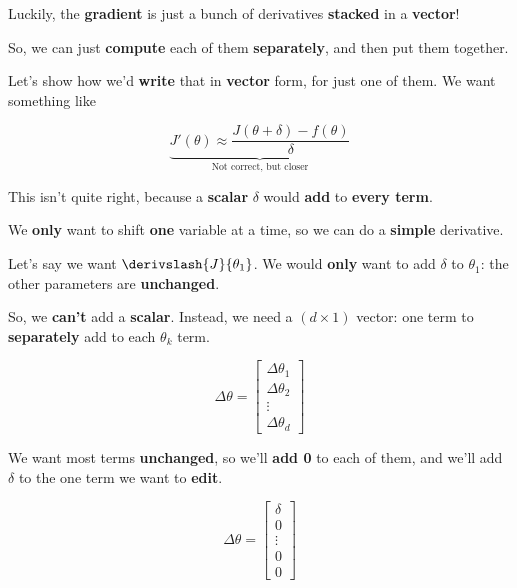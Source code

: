         Luckily, the \textbf{gradient} is just a bunch of derivatives \textbf{stacked} in a \textbf{vector}! 
        
        So, we can just \textbf{compute} each of them \textbf{separately}, and then put them together.
        
        Let's show how we'd \textbf{write} that in \textbf{vector} form, for just one of them. We want something like
        
        \begin{equation}
            \underbrace{
                J'(\theta) \approx
                \frac{J(\theta+\delta)-f(\theta)}{\delta} 
            }_{\text{Not correct, but closer}}
        \end{equation}
        
        This isn't quite right, because a \textbf{scalar} $\delta$ would \textbf{add} to \textbf{every term}.
        
        We \textbf{only} want to shift \textbf{one} variable at a time, so we can do a \textbf{simple} derivative.
        
        Let's say we want $\derivslash{J}{\theta_1}$. We would \textbf{only} want to add $\delta$ to $\theta_1$: the other parameters are \textbf{unchanged}.
        
        So, we \textbf{can't} add a \textbf{scalar}. Instead, we need a $(d \times 1)$ vector: one term to \textbf{separately} add to each $\theta_k$ term.
        
        \begin{equation}
            \Delta \theta 
            = 
            \begin{bmatrix}
                \Delta \theta_1 \\ \Delta \theta_2 \\ \vdots \\ \Delta \theta_d
            \end{bmatrix}
        \end{equation}
        
        We want most terms \textbf{unchanged}, so we'll \textbf{add 0} to each of them, and we'll add $\delta$ to the one term we want to \textbf{edit}.
        
        \begin{equation}
            \Delta \theta 
            = 
            \begin{bmatrix}
                \delta \\ 0 \\ \vdots\\ 0 \\ 0
            \end{bmatrix}
        \end{equation}
        
